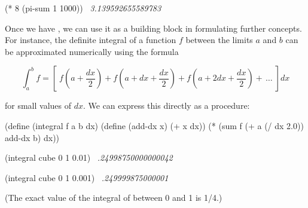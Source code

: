 \begin{codeBlock}
(* 8 (pi-sum 1 1000))
~\textit{3.139592655589783}~
\end{codeBlock}

\noindent
Once we have , we can use it as a building block in formulating
further concepts.  For instance, the definite integral of a function \( f \)
between the limits \( a \) and \( b \) can be approximated numerically using the
formula

$${\int_a^b \!\!\! f} = {\left[\;f\! \left(a + \frac{dx}{2}\right)
		+ f\! \left(a + dx + \frac{dx}{2}\right)
		+ f\! \left(a + 2dx + \frac{dx}{2}\right) + \,\dots \;\right]\! dx} $$

\noindent
for small values of \( dx \).  We can express this directly as a procedure:

\begin{codeBlock}
(define (integral f a b dx)
  (define (add-dx x)
    (+ x dx))
  (* (sum f (+ a (/ dx 2.0)) add-dx b)
     dx))

(integral cube 0 1 0.01)
~\textit{.24998750000000042}~

(integral cube 0 1 0.001)
~\textit{.249999875000001}~
\end{codeBlock}

\noindent
(The exact value of the integral of  between 0 and 1 is 1/4.)

